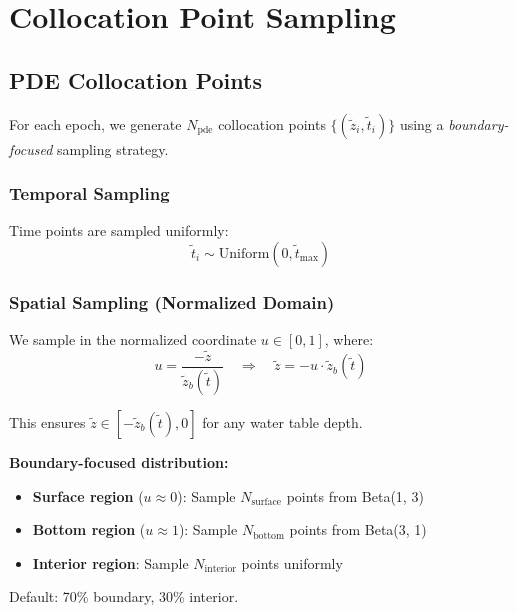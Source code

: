 \documentclass[11pt,a4paper]{article}
\begin{document}
\section{Collocation Point Sampling}

\subsection{PDE Collocation Points}

For each epoch, we generate $N_{\text{pde}}$ collocation points $\{(\tilde{z}_i, \tilde{t}_i)\}$ using a \textit{boundary-focused} sampling strategy.

\subsubsection{Temporal Sampling}
Time points are sampled uniformly:
\begin{equation}
    \tilde{t}_i \sim \text{Uniform}(0, \tilde{t}_{\max})
\end{equation}

\subsubsection{Spatial Sampling (Normalized Domain)}

We sample in the normalized coordinate $u \in [0, 1]$, where:
\begin{equation}
    u = \frac{-\tilde{z}}{\tilde{z}_b(\tilde{t})} \quad \Rightarrow \quad \tilde{z} = -u \cdot \tilde{z}_b(\tilde{t})
\end{equation}

This ensures $\tilde{z} \in [-\tilde{z}_b(\tilde{t}), 0]$ for any water table depth.

\textbf{Boundary-focused distribution:}
\begin{itemize}
    \item \textbf{Surface region} ($u \approx 0$): Sample $N_{\text{surface}}$ points from Beta(1, 3)
    \item \textbf{Bottom region} ($u \approx 1$): Sample $N_{\text{bottom}}$ points from Beta(3, 1)
    \item \textbf{Interior region}: Sample $N_{\text{interior}}$ points uniformly
\end{itemize}

Default: 70\% boundary, 30\% interior.
\end{document}
